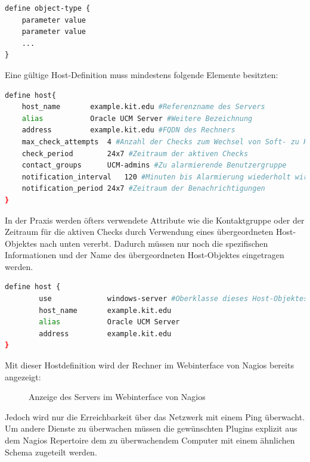 \begin{lstlisting}[captionpos=b, caption=Nagiosschema für Objektdefinitionen, label=schmeaobj, breaklines = false]
define object-type {
	parameter value
	parameter value
	...
}
\end{lstlisting}


Eine gültige Host-Definition muss mindestens folgende Elemente besitzten:

\begin{lstlisting}[captionpos=b, caption=Definition eines Hostobjektes, label=hostobj, breaklines = true, language=sh]
define host{
	host_name		example.kit.edu #Referenzname des Servers
	alias			Oracle UCM Server #Weitere Bezeichnung
	address			example.kit.edu #FQDN des Rechners
	max_check_attempts	4 #Anzahl der Checks zum Wechsel von Soft- zu Hard-State
	check_period		24x7 #Zeitraum der aktiven Checks
	contact_groups		UCM-admins #Zu alarmierende Benutzergruppe
	notification_interval	120 #Minuten bis Alarmierung wiederholt wird
	notification_period	24x7 #Zeitraum der Benachrichtigungen
}
\end{lstlisting}

In der Praxis werden öfters verwendete Attribute wie die Kontaktgruppe oder der Zeitraum für die aktiven Checks durch Verwendung eines übergeordneten Host-Objektes nach unten vererbt.
Dadurch müssen nur noch die spezifischen Informationen und der Name des übergeordneten Host-Objektes eingetragen werden.
\begin{lstlisting}[captionpos=b, caption=Verkürzte Definition eines Hostobjektes, label=vhostobj, breaklines = true, language=sh]
define host {
        use             windows-server #Oberklasse dieses Host-Objektes
        host_name       example.kit.edu
        alias           Oracle UCM Server
        address         example.kit.edu
}
\end{lstlisting}

Mit dieser Hostdefinition wird der Rechner im Webinterface von Nagios bereits angezeigt:

\begin{figure}[ht]
	\centering
		\caption{Anzeige des Servers im Webinterface von Nagios}
		\label{check-swap}
\end{figure}

Jedoch wird nur die Erreichbarkeit über das Netzwerk mit einem Ping überwacht.
Um andere Dienste zu überwachen müssen die gewünschten Plugins explizit aus dem Nagios Repertoire dem zu überwachendem Computer mit einem ähnlichen Schema zugeteilt werden.

